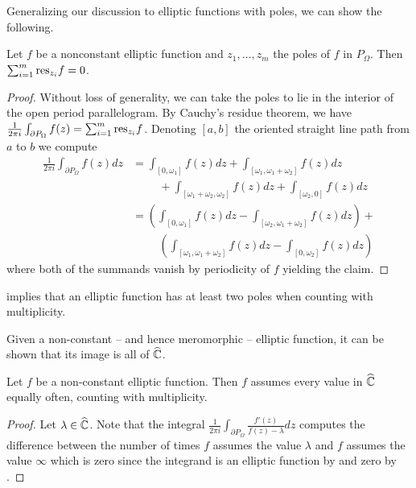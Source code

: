 Generalizing our discussion to elliptic functions with poles, we can show the following. 
\begin{proposition}\label{prop: residue sum is zero}
    Let $f$ be a nonconstant elliptic function and $z_{1},\dots,z_{m}$ the poles of $f$ in $P_{\Omega}$. Then $\sum_{i=1}^{m}\mathrm{res}_{z_{i}}f=0$. 
\end{proposition}
\begin{proof}
    Without loss of generality, we can take the poles to lie in the interior of the open period parallelogram. By Cauchy's residue theorem, we have $\frac{1}{2\pi i}\int_{\partial P_{\Omega}}f(z)=\sum_{i=1}^{m}\mathrm{res}_{z_{i}}f$. Denoting $[a,b]$ the oriented straight line path from $a$ to $b$ we compute
    \begin{align*}
        \frac{1}{2\pi i}\int_{\partial P_{\Omega}}f(z)dz &= \int_{[0,\omega_{1}]}f(z)dz + \int_{[\omega_{1},\omega_{1}+\omega_{2}]}f(z)dz\\
        &\hspace{1cm}+\int_{[\omega_{1}+\omega_{2},\omega_{2}]}f(z)dz + \int_{[\omega_{2},0]}f(z)dz \\
        &= \left(\int_{[0,\omega_{1}]}f(z)dz - \int_{[\omega_{2},\omega_{1}+\omega_{2}]}f(z)dz\right) + \\
        &\hspace{1cm} \left(\int_{[\omega_{1},\omega_{1}+\omega_{2}]}f(z)dz-\int_{[0,\omega_{2}]}f(z)dz\right)
    \end{align*}
    where both of the summands vanish by periodicity of $f$ yielding the claim. 
\end{proof}
\begin{remark}\label{rmk: at least two poles}
     implies that an elliptic function has at least two poles when counting with multiplicity. 
\end{remark}
Given a non-constant -- and hence meromorphic -- elliptic function, it can be shown that its image is all of $\widehat{\mathbb{C}}$. 
\begin{proposition}\label{prop: assumes every value}
    Let $f$ be a non-constant elliptic function. Then $f$ assumes every value in $\widehat{\mathbb{C}}$ equally often, counting with multiplicity. 
\end{proposition}
\begin{proof}
    Let $\lambda\in\widehat{\mathbb{C}}$. Note that the integral $\frac{1}{2\pi i}\int_{\partial P_{\Omega}}\frac{f'(z)}{f(z)-\lambda}dz$ computes the difference between the number of times $f$ assumes the value $\lambda$ and $f$ assumes the value $\infty$ which is zero since the integrand is an elliptic function by  and zero by . 
\end{proof}
